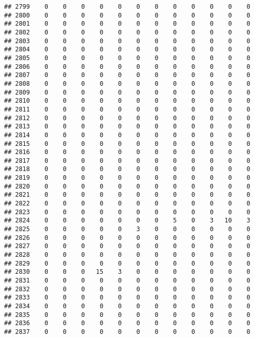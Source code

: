 \documentclass[]{article}
\begin{document}
\begin{verbatim}
## 2799    0    0    0    0    0    0    0    0    0    0    0    0
## 2800    0    0    0    0    0    0    0    0    0    0    0    0
## 2801    0    0    0    0    0    0    0    0    0    0    0    0
## 2802    0    0    0    0    0    0    0    0    0    0    0    0
## 2803    0    0    0    0    0    0    0    0    0    0    0    0
## 2804    0    0    0    0    0    0    0    0    0    0    0    0
## 2805    0    0    0    0    0    0    0    0    0    0    0    0
## 2806    0    0    0    0    0    0    0    0    0    0    0    0
## 2807    0    0    0    0    0    0    0    0    0    0    0    0
## 2808    0    0    0    0    0    0    0    0    0    0    0    0
## 2809    0    0    0    0    0    0    0    0    0    0    0    0
## 2810    0    0    0    0    0    0    0    0    0    0    0    0
## 2811    0    0    0    0    0    0    0    0    0    0    0    0
## 2812    0    0    0    0    0    0    0    0    0    0    0    0
## 2813    0    0    0    0    0    0    0    0    0    0    0    0
## 2814    0    0    0    0    0    0    0    0    0    0    0    0
## 2815    0    0    0    0    0    0    0    0    0    0    0    0
## 2816    0    0    0    0    0    0    0    0    0    0    0    0
## 2817    0    0    0    0    0    0    0    0    0    0    0    0
## 2818    0    0    0    0    0    0    0    0    0    0    0    0
## 2819    0    0    0    0    0    0    0    0    0    0    0    0
## 2820    0    0    0    0    0    0    0    0    0    0    0    0
## 2821    0    0    0    0    0    0    0    0    0    0    0    0
## 2822    0    0    0    0    0    0    0    0    0    0    0    0
## 2823    0    0    0    0    0    0    0    0    0    0    0    0
## 2824    0    0    0    0    0    0    0    5    0    3   10    3
## 2825    0    0    0    0    0    3    0    0    0    0    0    0
## 2826    0    0    0    0    0    0    0    0    0    0    0    0
## 2827    0    0    0    0    0    0    0    0    0    0    0    0
## 2828    0    0    0    0    0    0    0    0    0    0    0    0
## 2829    0    0    0    0    0    0    0    0    0    0    0    0
## 2830    0    0    0   15    3    0    0    0    0    0    0    0
## 2831    0    0    0    0    0    0    0    0    0    0    0    0
## 2832    0    0    0    0    0    0    0    0    0    0    0    0
## 2833    0    0    0    0    0    0    0    0    0    0    0    0
## 2834    0    0    0    0    0    0    0    0    0    0    0    0
## 2835    0    0    0    0    0    0    0    0    0    0    0    0
## 2836    0    0    0    0    0    0    0    0    0    0    0    0
## 2837    0    0    0    0    0    0    0    0    0    0    0    0

\end{verbatim}
\end{document}
